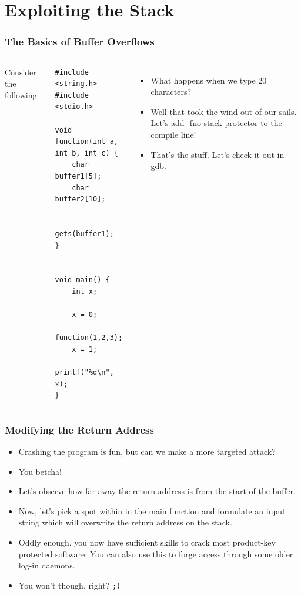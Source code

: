 \documentclass{beamer}
\begin{document}
\section{Exploiting the Stack}
\begin{frame}[fragile]
    \frametitle{The Basics of Buffer Overflows}
    \begin{columns}
    Consider the following:
    {\scriptsize
    \begin{verbatim}
#include <string.h>
#include <stdio.h>

void function(int a, int b, int c) {
    char buffer1[5];
    char buffer2[10];

    gets(buffer1);
}


void main() {
    int x;

    x = 0;
    function(1,2,3);
    x = 1;
    printf("%d\n", x);
}

    \end{verbatim}
    }
    \begin{itemize}[<+->]
        \item What happens when we type 20 characters?
        \item Well that took the wind out of our sails.  Let's add -fno-stack-protector to the compile line!
        \item That's the stuff.  Let's check it out in gdb.
    \end{itemize}
    \end{columns}
\end{frame}

\begin{frame}
    \frametitle{Modifying the Return Address}
    \begin{itemize}[<+->]
        \item Crashing the program is fun, but can we make a more targeted attack?  
        \item You betcha!
        \item Let's observe how far away the return address is from the start of the buffer.
        \item Now, let's pick a spot within in the main function and formulate an input string which will overwrite the return address on the stack.
        \item Oddly enough, you now have sufficient skills to crack most product-key protected software.  You can also use this to forge access through some older log-in daemons.
        \item You won't though, right? {\tt ;) }
    \end{itemize}
\end{frame}
\end{document}
